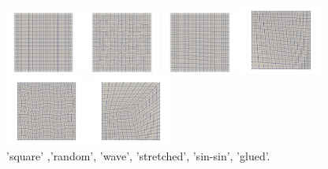 \begin{center}
\includegraphics[width=2.5cm]{python_codes/fieldstone_76/results/mesh_type1}
\includegraphics[width=2.5cm]{python_codes/fieldstone_76/results/mesh_type2}
\includegraphics[width=2.5cm]{python_codes/fieldstone_76/results/mesh_type3}
\includegraphics[width=2.7cm]{python_codes/fieldstone_76/results/mesh_type4}
\includegraphics[width=2.7cm]{python_codes/fieldstone_76/results/mesh_type5}
\includegraphics[width=2.7cm]{python_codes/fieldstone_76/results/mesh_type6}\\
{\captionfont 'square' ,'random', 'wave', 'stretched', 'sin-sin', 'glued'.}
\end{center}

